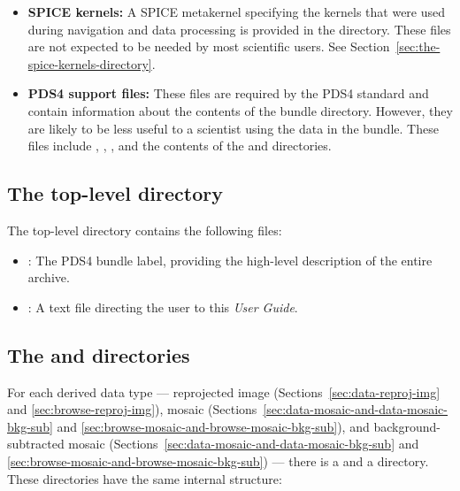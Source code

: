 \begin{itemize}
\item \textbf{SPICE kernels:} A SPICE metakernel specifying the kernels that were used during navigation and data processing is provided in the  directory. These files are not expected to be needed by most scientific users. See Section~\ref{sec:the-spice-kernels-directory}.
\item \textbf{PDS4 support files:} These files are required by the PDS4 standard and contain information about the contents of the bundle directory. However, they are likely to be less useful to a scientist using the data in the bundle. These files include , , , and the contents of the  and  directories.
\end{itemize}

\subsection{The top-level directory}
\label{sec:the-top-level-directory}

The top-level directory contains the following files:

\begin{itemize}
\item {}: The PDS4 bundle label, providing the high-level description of the entire archive.
\item {}: A text file directing the user to this \textit{User Guide}.
\end{itemize}

\subsection{The  and  directories}
\label{sec:the-browse-and-data-directories}

For each derived data type — reprojected image (Sections~\ref{sec:data-reproj-img} and \ref{sec:browse-reproj-img}), mosaic (Sections~\ref{sec:data-mosaic-and-data-mosaic-bkg-sub} and \ref{sec:browse-mosaic-and-browse-mosaic-bkg-sub}), and background-subtracted mosaic (Sections~\ref{sec:data-mosaic-and-data-mosaic-bkg-sub} and \ref{sec:browse-mosaic-and-browse-mosaic-bkg-sub}) — there is a  and a  directory. These directories have the same internal structure:

